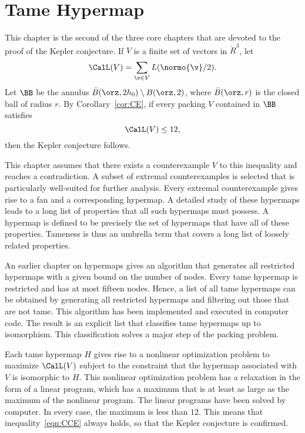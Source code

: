 

\chapter{Tame Hypermap}
%

\label{sec:tame}
%

\begin{summary}
  This chapter is the second of the three core chapters that are devoted
  to the proof of the Kepler conjecture.  If $V$ is a finite set of
  vectors in $\ring{R}^3$, let
  \[ \CalL(V) = \sum_{\v\in V}
    L(\normo{\v}/2).\] 
Let $\BB$ be the
annulus $\bar B(\orz,2h_0)\setminus B(\orz,2)$, where
$\bar B(\orz,r)$ is the closed ball of radius $r$.
By Corollary~\ref{cor:CE}, if every packing $V$
contained in $\BB$
satisfies
\begin{equation}\label{eqn:CCE}
\CalL(V) \le 12,
\end{equation}
then the Kepler conjecture follows.

This chapter assumes that there exists a counterexample $V$ to this
inequality and reaches a contradiction.  A subset of extremal
counterexamples  is selected that is particularly well-suited for
further analysis.  Every extremal counterexample gives rise to a fan
and a corresponding hypermap.  A detailed study of these hypermaps
leads to a long list of properties that all such hypermaps must
possess.  A  hypermap is defined to be precisely the set
of hypermaps that have all of these properties.  Tameness is thus an
umbrella term that covers a long list of loosely related properties.

An earlier chapter on hypermaps gives an algorithm that generates all
restricted hypermaps with a given bound on the number of nodes.
Every tame hypermap is restricted and has at most fifteen nodes.  Hence, a
list of all tame hypermaps can be obtained by generating all
restricted hypermaps and filtering out those that are not tame.  This
algorithm has been implemented and executed in computer code.  The result
 is an explicit list that classifies tame hypermaps
up to isomorphism.  This classification solves a major step of the
packing problem.

Each tame hypermap $H$ gives rise to a nonlinear optimization problem to
maximize $\CalL(V)$ subject to the constraint that the hypermap
associated with $V$ is isomorphic to $H$.  This nonlinear optimization
problem has a relaxation in the form of a linear program, which has a maximum
that is at least as large as the maximum of the nonlinear program.
The linear programs have been solved by computer.  In every case, the
maximum is less than $12$.  This means that inequality~\ref{eqn:CCE}
always holds, so that the Kepler conjecture is confirmed.
\end{summary}
%
%



